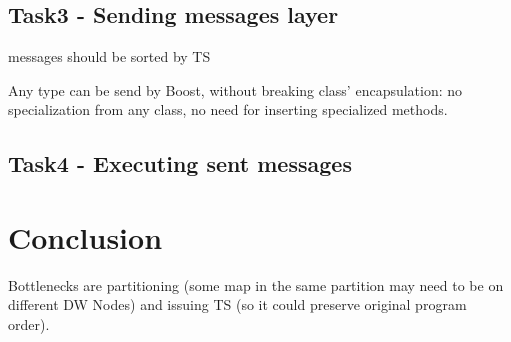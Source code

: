 \documentclass{sig-semester}
\begin{document}
\subsection{Task3 - Sending messages layer }
messages should be sorted by TS

Any type can be send by Boost, without breaking class' encapsulation: no specialization from any class, no need for inserting specialized methods.

\subsection {Task4 - Executing sent messages }

\section{Conclusion}
\vspace{2mm}
Bottlenecks are partitioning (some map in the same partition may need to be on different DW Nodes) and issuing TS (so it could preserve original program order).

%
%

\newpage
\end{document}
